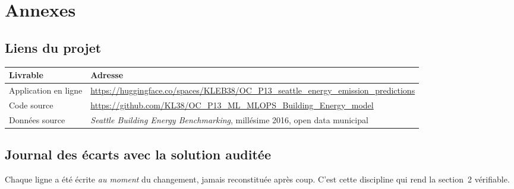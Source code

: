 \section{Annexes}

\subsection{Liens du projet}

\begin{table}[H]
\centering
\small
\begin{tabularx}{\linewidth}{@{}L{4.2cm}X@{}}
\toprule
\textbf{Livrable} & \textbf{Adresse} \\
\midrule
Application en ligne & \url{https://huggingface.co/spaces/KLEB38/OC_P13_seattle_energy_emission_predictions} \\
Code source & \url{https://github.com/KL38/OC_P13_ML_MLOPS_Building_Energy_model} \\
Données source & \emph{Seattle Building Energy Benchmarking}, millésime 2016, open data municipal \\
\bottomrule
\end{tabularx}
\end{table}

\subsection{Journal des écarts avec la solution auditée}
\label{ann:ecarts}

Chaque ligne a été écrite \emph{au moment} du changement, jamais reconstituée
après coup. C'est cette discipline qui rend la section~2 vérifiable.

